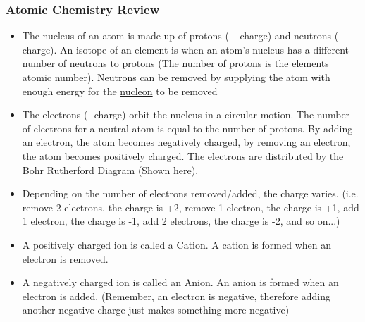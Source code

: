 \documentclass{article}
\begin{document}
\subsubsection{Atomic Chemistry Review}
\begin{itemize}
    \item The nucleus of an atom is made up of protons (+ charge) and neutrons (- charge). An isotope of an element is when an atom's nucleus has a different number of neutrons to protons (The number of protons is the elements atomic number). Neutrons can be removed by supplying the atom with enough energy for the \hyperref[sec:nucleon]{nucleon} to be removed
    \item The electrons (- charge) orbit the nucleus in a circular motion. The number of electrons for a neutral atom is equal to the number of protons. By adding an electron, the atom becomes negatively charged, by removing an electron, the atom becomes positively charged. The electrons are distributed by the Bohr Rutherford Diagram (Shown \hyperref[sec:electronwaves]{here}).
    \item Depending on the number of electrons removed/added, the charge varies. (i.e. remove 2 electrons, the charge is +2, remove 1 electron, the charge is +1, add 1 electron, the charge is -1, add 2 electrons, the charge is -2, and so on...)
    \item A positively charged ion is called a Cation. A cation is formed when an electron is removed.
    \item A negatively charged ion is called an Anion. An anion is formed when an electron is added. (Remember, an electron is negative, therefore adding another negative charge just makes something more negative)
\end{itemize}
\end{document}
